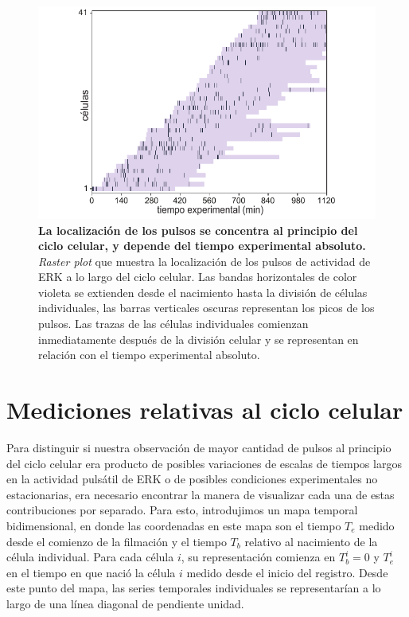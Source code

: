 \documentclass[./main.tex]{subfiles}
\begin{document}
\begin{figure}
    \centering
    \includegraphics[width=1\columnwidth]{figures/chapter4/C4_raster_plot.pdf}\caption{\textbf{La localización de los pulsos se concentra al principio del ciclo celular, y depende del tiempo experimental absoluto.} \textit{Raster plot} que muestra la localización de los pulsos de actividad de ERK a lo largo del ciclo celular. Las bandas horizontales de color violeta se extienden desde el nacimiento hasta la división de células individuales, las barras verticales oscuras representan los picos de los pulsos. Las trazas de las células individuales comienzan inmediatamente después de la división celular y se representan en relación con el tiempo experimental absoluto. }
    \label{C4_fig:raster_plot}
\end{figure}

\section{Mediciones relativas al ciclo celular}
\label{C4_sec:analisis}

Para distinguir si nuestra observación de mayor cantidad de pulsos al principio del ciclo celular era producto de posibles variaciones de escalas de tiempos largos en la actividad pulsátil de ERK o de posibles condiciones experimentales no estacionarias, era necesario encontrar la manera de visualizar cada una de estas contribuciones por separado. Para esto, introdujimos un mapa temporal bidimensional, en donde las coordenadas en este mapa son el tiempo $T_e$ medido desde el comienzo de la filmación y el tiempo $T_b$ relativo al nacimiento de la célula individual. Para cada célula $i$, su representación comienza en $T_b^i= 0$ y $T_e^i$ en el tiempo en que nació la célula $i$ medido desde el inicio del registro. Desde este punto del mapa, las series temporales individuales se representarían a lo largo de una línea diagonal de pendiente unidad. 
\end{document}
